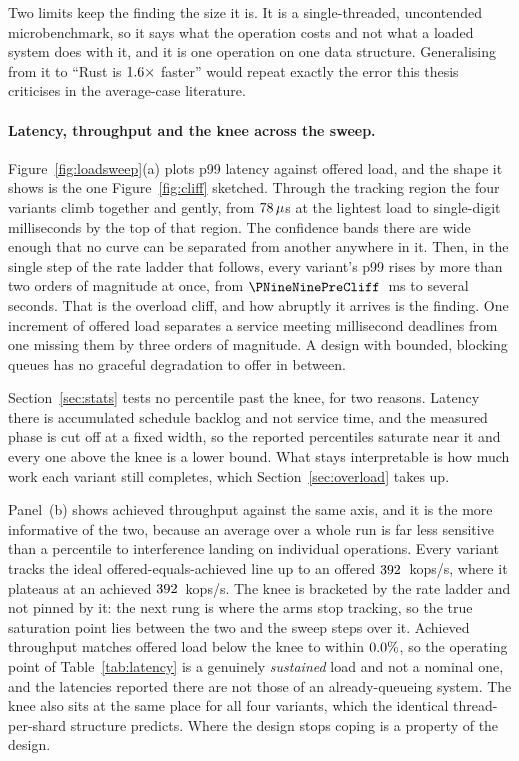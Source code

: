 \documentclass[english,oneside,a4paper,censored,csm,software-track-2020]{HYthesisML}
\begin{document}
Two limits keep the finding the size it is. It is a single-threaded, uncontended
microbenchmark, so it says what the operation costs and not what a loaded system does with it, and
it is one operation on one data structure. Generalising from it to ``Rust is
$1.6\times$ faster'' would repeat exactly the error this thesis criticises in the
average-case literature.

\paragraph{Latency, throughput and the knee across the sweep.}
Figure~\ref{fig:loadsweep}(a) plots p99 latency against offered load, and the shape it shows is
the one Figure~\ref{fig:cliff} sketched. Through the tracking region the four variants climb
together and gently, from $78\,\mu$s at the lightest load to single-digit
milliseconds by the top of that region. The confidence bands there are wide enough that no curve can
be separated from another anywhere in it. Then, in the single step of the rate ladder that follows,
every variant's p99 rises by more than two orders of magnitude at once, from
$\PNineNinePreCliff$~ms to
several seconds. That is the overload cliff, and how abruptly it arrives is the finding. One
increment of offered load separates a service meeting millisecond deadlines from one missing them
by three orders of magnitude. A design with bounded, blocking queues has no graceful degradation
to offer in between.

Section~\ref{sec:stats} tests no percentile past the knee, for two reasons. Latency there is
accumulated schedule backlog and not service time, and the measured phase is cut off at a fixed
width, so the reported percentiles saturate near it and every one above the knee is a lower bound.
What stays interpretable is how much work each variant still completes, which
Section~\ref{sec:overload} takes up.

Panel~(b) shows achieved throughput against the same axis, and it is the
more informative of the two, because an average over a whole run is far less sensitive than
a percentile to interference landing on individual operations. Every variant tracks the ideal
offered-equals-achieved line up to an offered $392$~kops/s, where it plateaus at an
achieved $392$~kops/s. The knee is bracketed by the rate ladder and not pinned by it: the next
rung is where the arms stop tracking, so the true saturation point lies between the two and the
sweep steps over it. Achieved throughput matches offered load below the knee to within
$0.0\%$, so the operating point of Table~\ref{tab:latency} is a genuinely
\emph{sustained} load and not a nominal one, and the latencies reported there are not those of an
already-queueing system. The knee also sits at the same place for all four variants, which the
identical thread-per-shard structure predicts. Where the design stops coping is a property of the
design.
\end{document}
